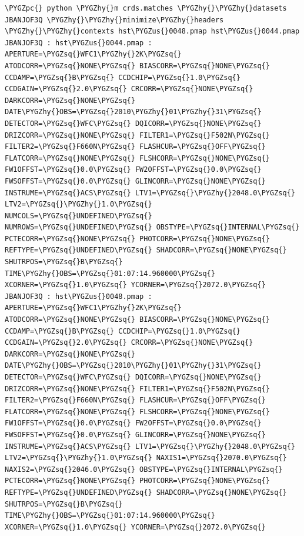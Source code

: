 \documentclass[letterpaper,10pt,english]{sphinxmanual}
\def\PYGZus{\char`\_}
\def\PYGZpc{\char`\%}
\def\PYGZhy{\char`\-}
\def\PYGZsq{\char`\'}
\begin{document}
\begin{Verbatim}[commandchars=\\\{\}]
\PYGZpc{} python \PYGZhy{}m crds.matches \PYGZhy{}\PYGZhy{}datasets JBANJOF3Q \PYGZhy{}\PYGZhy{}minimize\PYGZhy{}headers \PYGZhy{}\PYGZhy{}contexts hst\PYGZus{}0048.pmap hst\PYGZus{}0044.pmap
JBANJOF3Q : hst\PYGZus{}0044.pmap : APERTURE=\PYGZsq{}WFC1\PYGZhy{}2K\PYGZsq{} ATODCORR=\PYGZsq{}NONE\PYGZsq{} BIASCORR=\PYGZsq{}NONE\PYGZsq{} CCDAMP=\PYGZsq{}B\PYGZsq{} CCDCHIP=\PYGZsq{}1.0\PYGZsq{} CCDGAIN=\PYGZsq{}2.0\PYGZsq{} CRCORR=\PYGZsq{}NONE\PYGZsq{} DARKCORR=\PYGZsq{}NONE\PYGZsq{} DATE\PYGZhy{}OBS=\PYGZsq{}2010\PYGZhy{}01\PYGZhy{}31\PYGZsq{} DETECTOR=\PYGZsq{}WFC\PYGZsq{} DQICORR=\PYGZsq{}NONE\PYGZsq{} DRIZCORR=\PYGZsq{}NONE\PYGZsq{} FILTER1=\PYGZsq{}F502N\PYGZsq{} FILTER2=\PYGZsq{}F660N\PYGZsq{} FLASHCUR=\PYGZsq{}OFF\PYGZsq{} FLATCORR=\PYGZsq{}NONE\PYGZsq{} FLSHCORR=\PYGZsq{}NONE\PYGZsq{} FW1OFFST=\PYGZsq{}0.0\PYGZsq{} FW2OFFST=\PYGZsq{}0.0\PYGZsq{} FWSOFFST=\PYGZsq{}0.0\PYGZsq{} GLINCORR=\PYGZsq{}NONE\PYGZsq{} INSTRUME=\PYGZsq{}ACS\PYGZsq{} LTV1=\PYGZsq{}\PYGZhy{}2048.0\PYGZsq{} LTV2=\PYGZsq{}\PYGZhy{}1.0\PYGZsq{} NUMCOLS=\PYGZsq{}UNDEFINED\PYGZsq{} NUMROWS=\PYGZsq{}UNDEFINED\PYGZsq{} OBSTYPE=\PYGZsq{}INTERNAL\PYGZsq{} PCTECORR=\PYGZsq{}NONE\PYGZsq{} PHOTCORR=\PYGZsq{}NONE\PYGZsq{} REFTYPE=\PYGZsq{}UNDEFINED\PYGZsq{} SHADCORR=\PYGZsq{}NONE\PYGZsq{} SHUTRPOS=\PYGZsq{}B\PYGZsq{} TIME\PYGZhy{}OBS=\PYGZsq{}01:07:14.960000\PYGZsq{} XCORNER=\PYGZsq{}1.0\PYGZsq{} YCORNER=\PYGZsq{}2072.0\PYGZsq{}
JBANJOF3Q : hst\PYGZus{}0048.pmap : APERTURE=\PYGZsq{}WFC1\PYGZhy{}2K\PYGZsq{} ATODCORR=\PYGZsq{}NONE\PYGZsq{} BIASCORR=\PYGZsq{}NONE\PYGZsq{} CCDAMP=\PYGZsq{}B\PYGZsq{} CCDCHIP=\PYGZsq{}1.0\PYGZsq{} CCDGAIN=\PYGZsq{}2.0\PYGZsq{} CRCORR=\PYGZsq{}NONE\PYGZsq{} DARKCORR=\PYGZsq{}NONE\PYGZsq{} DATE\PYGZhy{}OBS=\PYGZsq{}2010\PYGZhy{}01\PYGZhy{}31\PYGZsq{} DETECTOR=\PYGZsq{}WFC\PYGZsq{} DQICORR=\PYGZsq{}NONE\PYGZsq{} DRIZCORR=\PYGZsq{}NONE\PYGZsq{} FILTER1=\PYGZsq{}F502N\PYGZsq{} FILTER2=\PYGZsq{}F660N\PYGZsq{} FLASHCUR=\PYGZsq{}OFF\PYGZsq{} FLATCORR=\PYGZsq{}NONE\PYGZsq{} FLSHCORR=\PYGZsq{}NONE\PYGZsq{} FW1OFFST=\PYGZsq{}0.0\PYGZsq{} FW2OFFST=\PYGZsq{}0.0\PYGZsq{} FWSOFFST=\PYGZsq{}0.0\PYGZsq{} GLINCORR=\PYGZsq{}NONE\PYGZsq{} INSTRUME=\PYGZsq{}ACS\PYGZsq{} LTV1=\PYGZsq{}\PYGZhy{}2048.0\PYGZsq{} LTV2=\PYGZsq{}\PYGZhy{}1.0\PYGZsq{} NAXIS1=\PYGZsq{}2070.0\PYGZsq{} NAXIS2=\PYGZsq{}2046.0\PYGZsq{} OBSTYPE=\PYGZsq{}INTERNAL\PYGZsq{} PCTECORR=\PYGZsq{}NONE\PYGZsq{} PHOTCORR=\PYGZsq{}NONE\PYGZsq{} REFTYPE=\PYGZsq{}UNDEFINED\PYGZsq{} SHADCORR=\PYGZsq{}NONE\PYGZsq{} SHUTRPOS=\PYGZsq{}B\PYGZsq{} TIME\PYGZhy{}OBS=\PYGZsq{}01:07:14.960000\PYGZsq{} XCORNER=\PYGZsq{}1.0\PYGZsq{} YCORNER=\PYGZsq{}2072.0\PYGZsq{}
\end{Verbatim}
\end{document}
